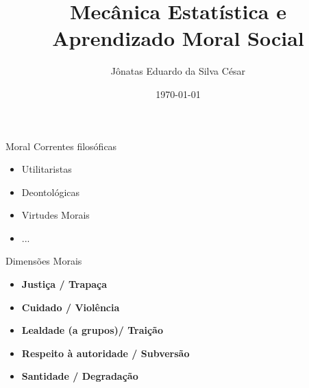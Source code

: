 \documentclass{beamer}
\begin{document}
    \title{Mecânica Estatística e \\Aprendizado Moral Social}%
    \author{Jônatas Eduardo da Silva César}
    \date{\today}
    
    \begin{frame}
        \titlepage
    \end{frame}%

    \begin{frame}{Moral}%
       Correntes filosóficas
        \begin{itemize}
            \item Utilitaristas
            \item Deontológicas
            \item Virtudes Morais 
            \item ... 
        \end{itemize}
    \end{frame}%
    
    \begin{frame}{Dimensões Morais}%
        \begin{itemize}
            \item \textbf{Justiça / Trapaça}

            \item \textbf{Cuidado / Violência}

            \item \textbf{Lealdade (a grupos)/ Traição}

            \item \textbf{Respeito à autoridade / Subversão} 

            \item \textbf{Santidade / Degradação} 
       \end{itemize}
    \end{frame}%
\end{document}
